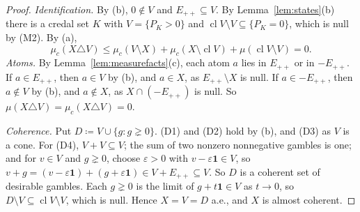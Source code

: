 \documentclass[11pt]{article}
\theoremstyle{definition}
\newcommand{\one}{\mathbf 1}
\newcommand{\Epp}{E_{++}}
\DeclareMathOperator{\cl}{cl}
\begin{document}
\begin{proof}
\emph{Identification.} By (b), $0\notin V$ and $\Epp\subseteq V$. By Lemma~\ref{lem:states}(b) there is a credal set $K$ with $V=\{P_K>0\}$ and $\cl V\setminus V\subseteq\{P_K=0\}$, which is null by (M2). By (a),
\[
\mu_c(X\triangle V)\le\mu_c(V\setminus X)+\mu_c(X\setminus\cl V)+\mu(\cl V\setminus V)=0 .
\]
\emph{Atoms.} By Lemma~\ref{lem:measurefacts}(c), each atom $a$ lies in $\Epp$ or in $-\Epp$. If $a\in\Epp$, then $a\in V$ by (b), and $a\in X$, as $\Epp\setminus X$ is null. If $a\in-\Epp$, then $a\notin V$ by (b), and $a\notin X$, as $X\cap(-\Epp)$ is null. So $\mu(X\triangle V)=\mu_c(X\triangle V)=0$.

\emph{Coherence.} Put $D\coloneqq V\cup\{g:g\gneq0\}$. (D1) and (D2) hold by (b), and (D3) as $V$ is a cone. For (D4), $V+V\subseteq V$; the sum of two nonzero nonnegative gambles is one; and for $v\in V$ and $g\gneq0$, choose $\varepsilon>0$ with $v-\varepsilon\one\in V$, so $v+g=(v-\varepsilon\one)+(g+\varepsilon\one)\in V+\Epp\subseteq V$. So $D$ is a coherent set of desirable gambles. Each $g\gneq0$ is the limit of $g+t\one\in V$ as $t\to0$, so $D\setminus V\subseteq\cl V\setminus V$, which is null. Hence $X=V=D$ a.e., and $X$ is almost coherent.
\end{proof}
\end{document}
